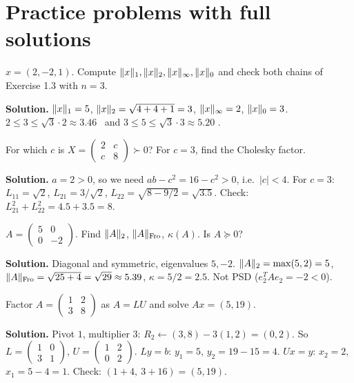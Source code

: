 \section{Practice problems with full solutions}

\begin{example}[P1: Norms]
$x=(2,-2,1)$. Compute $\lVert x\rVert_1,\lVert x\rVert_2,\lVert x\rVert_\infty,\lVert x\rVert_0$ and check both chains of Exercise 1.3 with $n=3$.

\textbf{Solution.} $\lVert x\rVert_1=5$, $\lVert x\rVert_2=\sqrt{4+4+1}=3$, $\lVert x\rVert_\infty=2$, $\lVert x\rVert_0=3$.
$2\le3\le\sqrt3\cdot2\approx3.46$ \checkmark\ and $3\le5\le\sqrt3\cdot3\approx5.20$ \checkmark.
\end{example}

\begin{example}
For which $c$ is $X=\begin{pmatrix}2&c\\c&8\end{pmatrix}\succ0$? For $c=3$, find the Cholesky factor.

\textbf{Solution.} $a=2>0$, so we need $ab-c^2 = 16-c^2>0$, i.e.\ $|c|<4$.
For $c=3$: $L_{11}=\sqrt2$, $L_{21}=3/\sqrt2$, $L_{22}=\sqrt{8-9/2}=\sqrt{3.5}$. Check: $L_{21}^2+L_{22}^2 = 4.5+3.5 = 8$. \checkmark
\end{example}

\begin{example}
$A=\begin{pmatrix}5&0\\0&-2\end{pmatrix}$. Find $\lVert A\rVert_2$, $\lVert A\rVert_{\mathrm{Fro}}$, $\kappa(A)$. Is $A\succeq0$?

\textbf{Solution.} Diagonal and symmetric, eigenvalues $5,-2$. $\lVert A\rVert_2=\max(5,2)=5$, $\lVert A\rVert_{\mathrm{Fro}}=\sqrt{25+4}=\sqrt{29}\approx5.39$,
$\kappa=5/2=2.5$. Not PSD ($e_2^TAe_2=-2<0$).
\end{example}

\begin{example}
Factor $A=\begin{pmatrix}1&2\\3&8\end{pmatrix}$ as $A=LU$ and solve $Ax=(5,19)$.

\textbf{Solution.} Pivot $1$, multiplier $3$: $R_2\leftarrow(3,8)-3(1,2)=(0,2)$. So $L=\begin{pmatrix}1&0\\3&1\end{pmatrix}$, $U=\begin{pmatrix}1&2\\0&2\end{pmatrix}$.
$Ly=b$: $y_1=5$, $y_2=19-15=4$. $Ux=y$: $x_2=2$, $x_1=5-4=1$. Check: $(1+4,\ 3+16)=(5,19)$. \checkmark
\end{example}

